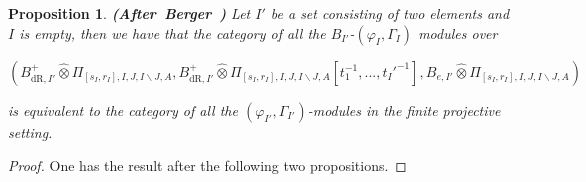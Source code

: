 \documentclass[12pt]{amsart}
\newtheorem{proposition}[theorem]{Proposition}
\theoremstyle{definition}
\numberwithin{equation}{section}
\begin{document}
\begin{proposition} \mbox{\bf{(After Berger \cite[Th\'eor\`eme A]{Ber1})}}
Let $I'$ be a set consisting of two elements and $I$ is empty, then we have that the category of all the $B_{I'}$-$(\varphi_I,\Gamma_I)$ modules over 
\begin{center}
$(B^+_{\mathrm{dR},I'}	\widehat{\otimes}\Pi_{[s_I,r_I],I,J,I\backslash J,A},B^+_{\mathrm{dR},I'}	\widehat{\otimes}\Pi_{[s_I,r_I],I,J,I\backslash J,A}[t_1^{-1},...,t_I'^{-1}],B_{e,I'}	\widehat{\otimes}\Pi_{[s_I,r_I],I,J,I\backslash J,A})$	
\end{center}
is equivalent to the category of all the $(\varphi_{I'},\Gamma_{I'})$-modules in the finite projective setting.
%
%
\end{proposition}
%
\begin{proof}
One has the result after the following two propositions.	
\end{proof}
\end{document}
